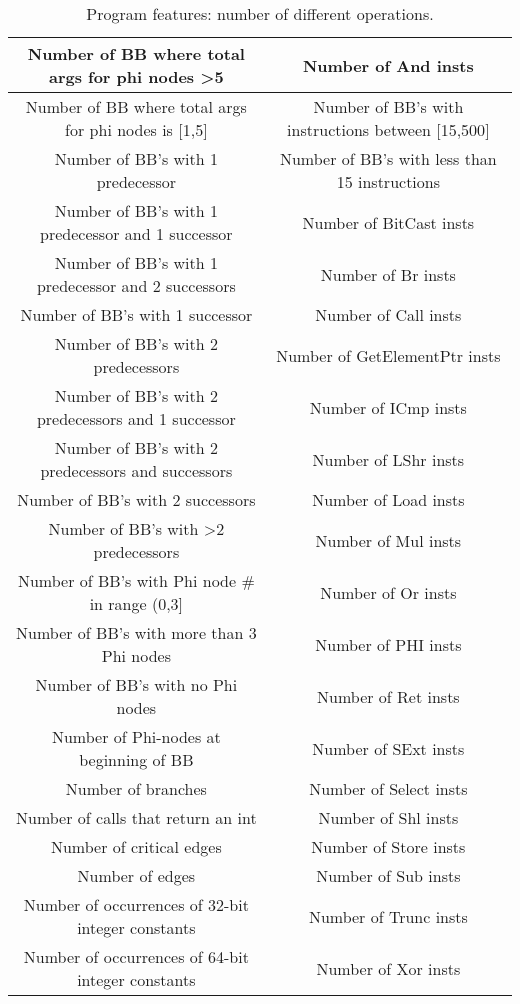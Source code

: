 \appendices
\begin{table*}[!t]
\centering
\caption{Program features: number of different operations.}
\begin{tabular}{|c|c|}
\hline
Number of BB where total args for phi nodes \textgreater 5 & Number of And insts \\ \hline
Number of BB where total args for phi nodes is {[}1,5{]} & Number of BB's with instructions between {[}15,500{]} \\ \hline
Number of BB's with 1 predecessor & Number of BB's with less than 15 instructions \\ \hline
Number of BB's with 1 predecessor and 1 successor & Number of BitCast insts \\ \hline
Number of BB's with 1 predecessor and 2 successors & Number of Br insts \\ \hline
Number of BB's with 1 successor & Number of Call insts \\ \hline
Number of BB's with 2 predecessors & Number of GetElementPtr insts \\ \hline
Number of BB's with 2 predecessors and 1 successor & Number of ICmp insts \\ \hline
Number of BB's with 2 predecessors and successors & Number of LShr insts \\ \hline
Number of BB's with 2 successors & Number of Load insts \\ \hline
Number of BB's with \textgreater{}2 predecessors & Number of Mul insts \\ \hline
Number of BB's with Phi node \# in range (0,3{]} & Number of Or insts \\ \hline
Number of BB's with more than 3 Phi nodes & Number of PHI insts \\ \hline
Number of BB's with no Phi nodes & Number of Ret insts \\ \hline
Number of Phi-nodes at beginning of BB & Number of SExt insts \\ \hline
Number of branches & Number of Select insts \\ \hline
Number of calls that return an int & Number of Shl insts \\ \hline
Number of critical edges & Number of Store insts \\ \hline
Number of edges & Number of Sub insts \\ \hline
Number of occurrences of 32-bit integer constants & Number of Trunc insts \\ \hline
Number of occurrences of 64-bit integer constants & Number of Xor insts \\ \hline

\end{tabular}
\end{table*}
